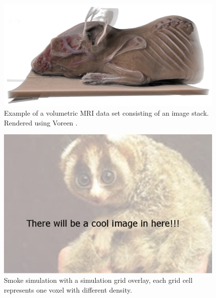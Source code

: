 {\begin{itemize}
\begin{minipage}{\linewidth}
      \begin{minipage}{0.45\linewidth}
          \begin{figure}[H]
              \includegraphics[width=\linewidth]{images/volumerat}
              \captionsetup{width=\linewidth}
              \caption[Volumetric image data example, source \cite{RDR10}.]{Example of a volumetric MRI data set consisting of an image stack. Rendered using Voreen  \cite{RDR10}.}\label{fig:RAT}
          \end{figure}
      \end{minipage}
      \hspace{0.05\linewidth}
      \begin{minipage}{0.45\linewidth}
          \begin{figure}[H]
              \includegraphics[width=\linewidth]{images/temp}
              \captionsetup{width=\linewidth}
              \caption[Smoke simulation on regular 3D grid.]{Smoke simulation with a simulation grid overlay, each grid cell represents one voxel with different density\footnotemark[1]. }\label{fig:SIMGRID}
          \end{figure}
      \end{minipage}
  \end{minipage}




\end{itemize}}
